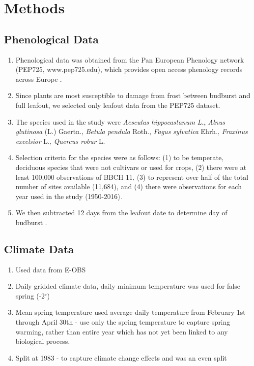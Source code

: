\documentclass{article}\usepackage[]{graphicx}\usepackage[]{color}
\begin{document}
\section*{Methods}
\subsection*{Phenological Data}
\begin{enumerate}
\item Phenological data was obtained from the Pan European Phenology network (PEP725, www.pep725.edu), which provides open access phenology records across Europe \citep{Templ2018}.
\item Since plants are most susceptible to damage from frost between budburst and full leafout, we selected only leafout data \citep[i.e., in][BBCH 11, which is defined as the point of leaf unfolding and the first visible leaf stalk]{Meier2001} from the PEP725 dataset.
\item The species used in the study were \textit{Aesculus hippocastanum L.}, \textit{Alnus glutinosa} (L.) Gaertn., \textit{Betula pendula} Roth., \textit{Fagus sylvatica} Ehrh., \textit{Fraxinus excelsior} L., \textit{Quercus robur} L.
\item Selection criteria for the species were as follows: (1) to be temperate, deciduous species that were not cultivars or used for crops, (2) there were at least 100,000 observations of BBCH 11, (3) to represent over half of the total number of sites available (11,684), and (4) there were observations for each year used in the study (1950-2016).
\item We then subtracted 12 days from the leafout date to determine day of budburst \citep{Donnelly2017}.
\end{enumerate}
\subsection*{Climate Data}
\begin{enumerate}
\item Used data from E-OBS
\item Daily gridded climate data, daily minimum temperature was used for false spring (-2$^{\circ}$)
\item Mean spring temperature used average daily temperature from February 1st through April 30th \citep{Korner2016} - use only the spring temperature to capture spring warming, rather than entire year which has not yet been linked to any biological process.
\item Split at 1983 - to capture climate change effects and was an even split
\end{enumerate}
\end{document}
